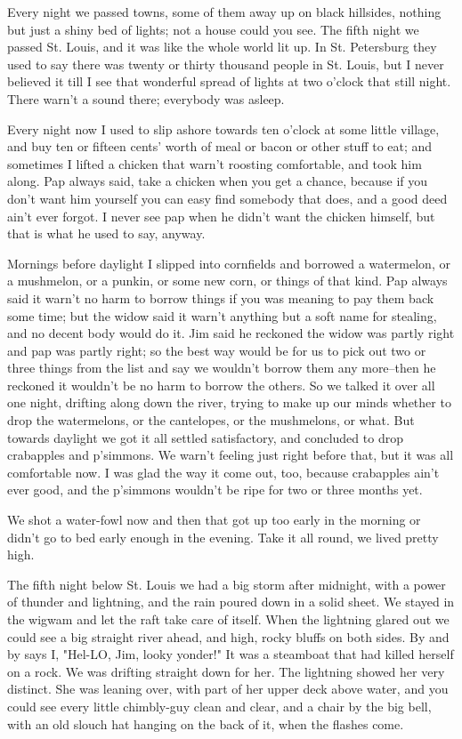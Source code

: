 Every night we passed towns, some of them away up on black hillsides,
nothing but just a shiny bed of lights; not a house could you see.  The
fifth night we passed St. Louis, and it was like the whole world lit up.
In St. Petersburg they used to say there was twenty or thirty thousand
people in St. Louis, but I never believed it till I see that wonderful
spread of lights at two o'clock that still night.  There warn't a sound
there; everybody was asleep.

Every night now I used to slip ashore towards ten o'clock at some little
village, and buy ten or fifteen cents' worth of meal or bacon or other
stuff to eat; and sometimes I lifted a chicken that warn't roosting
comfortable, and took him along.  Pap always said, take a chicken when
you get a chance, because if you don't want him yourself you can easy
find somebody that does, and a good deed ain't ever forgot.  I never see
pap when he didn't want the chicken himself, but that is what he used to
say, anyway.

Mornings before daylight I slipped into cornfields and borrowed a
watermelon, or a mushmelon, or a punkin, or some new corn, or things of
that kind.  Pap always said it warn't no harm to borrow things if you was
meaning to pay them back some time; but the widow said it warn't anything
but a soft name for stealing, and no decent body would do it.  Jim said
he reckoned the widow was partly right and pap was partly right; so the
best way would be for us to pick out two or three things from the list
and say we wouldn't borrow them any more--then he reckoned it wouldn't be
no harm to borrow the others.  So we talked it over all one night,
drifting along down the river, trying to make up our minds whether to
drop the watermelons, or the cantelopes, or the mushmelons, or what.  But
towards daylight we got it all settled satisfactory, and concluded to
drop crabapples and p'simmons.  We warn't feeling just right before that,
but it was all comfortable now.  I was glad the way it come out, too,
because crabapples ain't ever good, and the p'simmons wouldn't be ripe
for two or three months yet.

We shot a water-fowl now and then that got up too early in the morning or
didn't go to bed early enough in the evening.  Take it all round, we
lived pretty high.

The fifth night below St. Louis we had a big storm after midnight, with a
power of thunder and lightning, and the rain poured down in a solid
sheet. We stayed in the wigwam and let the raft take care of itself.
When the lightning glared out we could see a big straight river ahead,
and high, rocky bluffs on both sides.  By and by says I, "Hel-LO, Jim,
looky yonder!" It was a steamboat that had killed herself on a rock.  We
was drifting straight down for her.  The lightning showed her very
distinct.  She was leaning over, with part of her upper deck above water,
and you could see every little chimbly-guy clean and clear, and a chair
by the big bell, with an old slouch hat hanging on the back of it, when
the flashes come.

